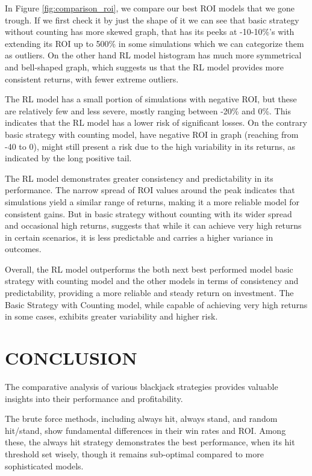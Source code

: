 \documentclass[a4paper,12pt]{report}
\begin{document}
In Figure \ref{fig:comparison_roi}, we compare our best ROI models that we gone trough. If we first check it by just the shape of it we can see that basic strategy without counting has more skewed graph, that has its peeks at -10-10\%'s with extending its ROI up to 500\% in some simulations which we can categorize them as outliers. On the other hand RL model histogram has much more symmetrical and bell-shaped graph, which suggests us that the RL model provides more consistent returns, with fewer extreme outliers.

The RL model has a small portion of simulations with negative ROI, but these are relatively few and less severe, mostly ranging between -20\% and 0\%. This indicates that the RL model has a lower risk of significant losses. On the contrary basic strategy with counting model, have negative ROI in graph (reaching from -40 to 0), might still present a risk due to the high variability in its returns, as indicated by the long positive tail.

The RL model demonstrates greater consistency and predictability in its performance. The narrow spread of ROI values around the peak indicates that simulations yield a similar range of returns, making it a more reliable model for consistent gains. But in basic strategy without counting with its wider spread and occasional high returns, suggests that while it can achieve very high returns in certain scenarios, it is less predictable and carries a higher variance in outcomes.

Overall, the RL model outperforms the both next best performed model basic strategy with counting model and the other models in terms of consistency and predictability, providing a more reliable and steady return on investment. The Basic Strategy with Counting model, while capable of achieving very high returns in some cases, exhibits greater variability and higher risk. 

\chapter{CONCLUSION}
\label{chapter:conclusion}

The comparative analysis of various blackjack strategies provides valuable insights into their performance and profitability. 

The brute force methods, including always hit, always stand, and random hit/stand, show fundamental differences in their win rates and ROI. Among these, the always hit strategy demonstrates the best performance, when its hit threshold set wisely, though it remains sub-optimal compared to more sophisticated models.
\end{document}

